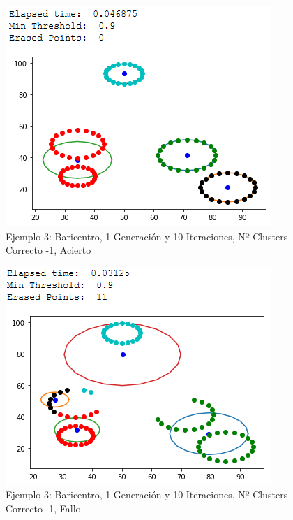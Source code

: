 \documentclass[conference,a4paper]{IEEEtran}
\begin{document}
\begin{figure}[H]
\centering
\includegraphics[scale=0.65]{Experimentacion/Ejemplo3/ej3_b_1_10_lc_correct}
\caption{Ejemplo 3: Baricentro, 1 Generación y 10 Iteraciones,  Nº Clusters Correcto -1, Acierto\\}
\end{figure}

\begin{figure}[H]
\centering
\includegraphics[scale=0.65]{Experimentacion/Ejemplo3/ej3_b_1_10_lc_wrong}
\caption{Ejemplo 3: Baricentro, 1 Generación y 10 Iteraciones,  Nº Clusters Correcto -1, Fallo\\}
\end{figure}
\end{document}
